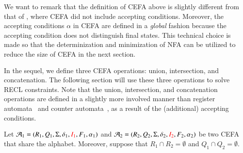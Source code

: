 We want to remark that the definition of CEFA above is slightly different from that of \cite{atva2020}, where CEFA did not include accepting conditions.
Moreover, the accepting conditions $\alpha$ in CEFA are defined in a \emph{global} fashion because the accepting condition does not distinguish final states. This technical choice is made so that the determinization and minimization of NFA can be utilized to reduce the size of CEFA in the next section. 

In the sequel, we define three CEFA operations: union, intersection, and concatenation. The following section will use these three operations to solve RECL constraints. Note that the union, intersection, and concatenation operations are defined in a slightly more involved manner than register automata~\cite{ra} and counter automata~\cite{GGM12}, as a result of the (additional) accepting conditions. 

Let $\mathcal{A}_1 = (R_1, Q_1, \Sigma, \delta_1, {\color{red}I_1\color{black}}, F_1, \alpha_1)$ and  $\mathcal{A}_2 = (R_2, Q_2, \Sigma, \delta_2, {\color{red}I_2\color{black}}, F_2, \alpha_2)$ be two CEFA that share the alphabet. 
Moreover, suppose that $R_1 \cap R_2 = \emptyset$ and $Q_1 \cap Q_2 = \emptyset$. 

